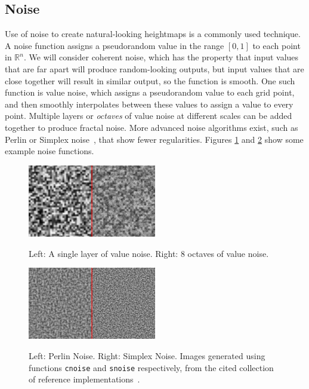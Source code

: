 \documentclass[11pt]{article}
\begin{document}
\subsection{Noise}
\label{section:noise}
Use of noise to create natural-looking heightmaps is a commonly used technique. A noise function assigns a pseudorandom value in the range $\left[0,1\right]$ to each point in $\mathbb{R}^n$. We will consider coherent noise, which has the property that input values that are far apart will produce random-looking outputs, but input values that are close together will result in similar output, so the function is smooth. One such function is value noise, which assigns a pseudorandom value to each grid point, and then smoothly interpolates between these values to assign a value to every point. Multiple layers or \textit{octaves} of value noise at different scales can be added together to produce fractal noise. More advanced noise algorithms exist, such as Perlin or Simplex noise~\cite{PerlinChapter2N}, that show fewer regularities. Figures \ref{fig:value_noise} and \ref{fig:better_noise} show some example noise functions.

\begin{figure}
  \caption{Left: A single layer of value noise. Right: 8 octaves of value noise.}
  \includegraphics[width=0.5\textwidth]{value_noise.png}
  \label{fig:value_noise}
\end{figure}

\begin{figure}
  \caption{Left: Perlin Noise. Right: Simplex Noise. Images generated using functions \texttt{cnoise} and \texttt{snoise} respectively, from the cited collection of reference implementations~\cite{github_2014}.}
  \includegraphics[width=0.5\textwidth]{better_noise.png}
  \label{fig:better_noise}
\end{figure}
\end{document}
